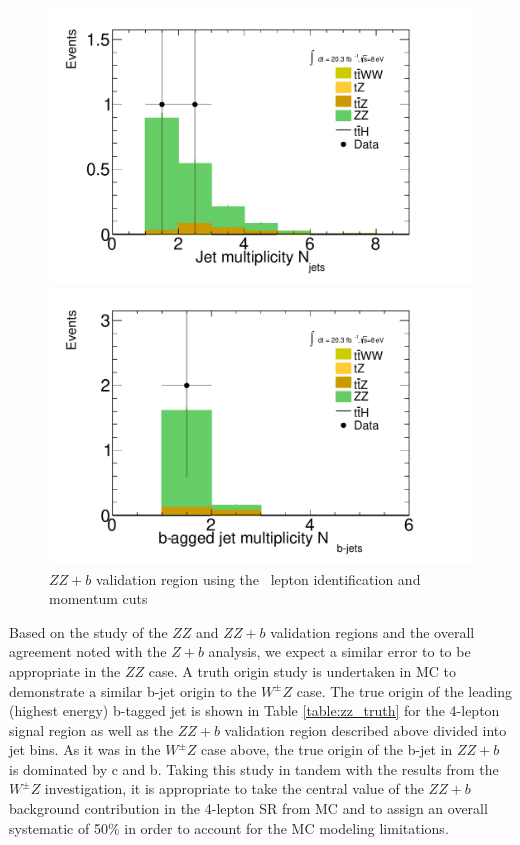 \begin{figure}[htbp]
  \begin{minipage}[h]{0.5\textwidth}
    \centering \includegraphics[width=\textwidth]{figs/WZ/zz_b_NJet}
  \end{minipage}\hfill
  \begin{minipage}[h]{0.5\textwidth}
    \centering \includegraphics[width=\textwidth]{figs/WZ/zz_b_NJetBTag}
  \end{minipage}\hfill
        \caption{$ZZ+b$ validation region using the \tth\ lepton identification and momentum cuts }
        \label{figure:background_zz_z_b}
\end{figure}
 
Based on the study of the $ZZ$ and $ZZ+b$ validation regions and the overall agreement noted with the $Z+b$ analysis, we expect a similar error to \WZ to be appropriate in the $ZZ$ case.  A truth origin study is undertaken in MC to demonstrate a similar b-jet origin to the $W^{\pm}Z$ case. The true origin of the leading (highest energy) b-tagged jet is shown in Table \ref{table:zz_truth} for the 4-lepton signal region as well as the $ZZ+b$ validation region described above divided into jet bins. As it was in the $W^{\pm}Z$ case above, the true origin of the b-jet in $ZZ+b$ is dominated by c and b. Taking this study in tandem with the results from the $W^{\pm}Z$ investigation, it is appropriate to take the central value of the $ZZ+b$ background contribution in the 4-lepton SR from MC and to assign an overall systematic of 50\% in order to account for the MC modeling limitations. 

